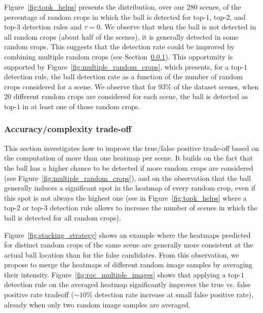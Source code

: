 \documentclass[sigconf, screen]{acmart}
\begin{document}
Figure~\ref{fig:topk_helps} presents the distribution, over our 280 scenes, of the percentage of random crops in which the ball is detected for top-$1$, top-$2$, and top-$3$ detection rules and $\tau=0$.
We observe that when the ball is not detected in all random crops (about half of the scenes), it is generally detected in some random crops.
This suggests that the detection rate could be improved by combining multiple random crops (see Section~\ref{subsec:tradeoff}). This opportunity is supported by Figure~\ref{fig:multiple_random_crops}, which presents, for a top-$1$ detection rule, the ball detection rate as a function of the number of random crops considered for a scene. We observe that for $93\%$ of the dataset scenes, when 20 different random crops are considered for each scene, the ball is detected as top-$1$ in at least one of those random crops.



\subsubsection{Accuracy/complexity trade-off}
\label{subsec:tradeoff}




This section investigates how to improve the true/false positive trade-off based on the computation of more than one heatmap per scene.
It builds on the fact that the ball has a higher chance to be detected if more random crops are considered (see Figure~\ref{fig:multiple_random_crops}),
and on the observation that the ball generally induces a significant spot in the heatmap of every random crop, even if this spot is not always the highest one (see in Figure~\ref{fig:topk_helps} where a top-$2$ or top-$3$ detection rule allows to increase the number of scenes in which the ball is detected for all random crops).

Figure~\ref{fig:stacking_strategy} shows an example where the heatmaps predicted for distinct random crops of the same scene are generally more consistent at the actual ball location than for the false candidates.
From this observation, we propose to merge the heatmaps of different random image samples by averaging their intensity. Figure~\ref{fig:roc_multiple_images} shows that applying a top-$1$ detection rule on the averaged heatmap significantly improves the true vs. false positive rate tradeoff ($\sim 10\%$ detection rate increase at small false positive rate), already when only two random image samples are averaged.
\end{document}
